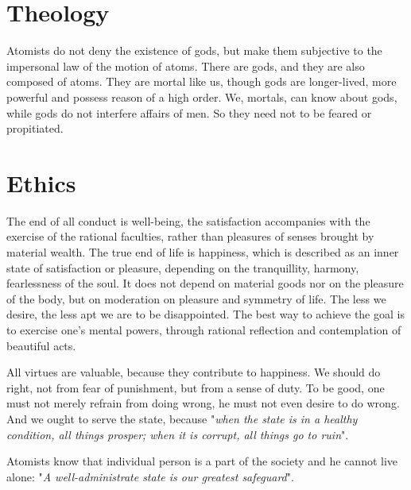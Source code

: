 \documentclass[11pt]{article}
\begin{document}
\begin{sloppypar}
\section{Theology}
Atomists do not deny the existence of gods, but make them subjective to the impersonal law of the motion of atoms. 
There are gods, and they are also composed of atoms. 
They are mortal like us, though gods are longer-lived, more powerful and possess reason of a high order. 
We, mortals, can know about gods, while gods do not interfere affairs of men. 
So they need not to be feared or propitiated.
  
\section{Ethics}
The end of all conduct is well-being, the satisfaction accompanies with the exercise of the rational faculties, rather than pleasures of senses brought by material wealth. 
The true end of life is happiness, which is described as an inner state of satisfaction or pleasure, depending on the tranquillity, harmony, fearlessness of the soul. 
It does not depend on material goods nor on the pleasure of the body, but on moderation on pleasure and symmetry of life. 
The less we desire, the less apt we are to be disappointed. 
The best way to achieve the goal is to exercise one’s mental powers, through rational reflection and contemplation of beautiful acts. 

\par

All virtues are valuable, because they contribute to happiness. 
We should do right, not from fear of punishment, but from a sense of duty. 
To be good, one must not merely refrain from doing wrong, he must not even desire to do wrong. 
And we ought to serve the state, because "\textit{when the state is in a healthy condition, all things prosper; when it is corrupt, all things go to ruin}". 

\par

Atomists know that individual person is a part of the society and he cannot live alone:
"\textit{A well-administrate state is our greatest safeguard}".
 
\end{sloppypar}
\end{document}
